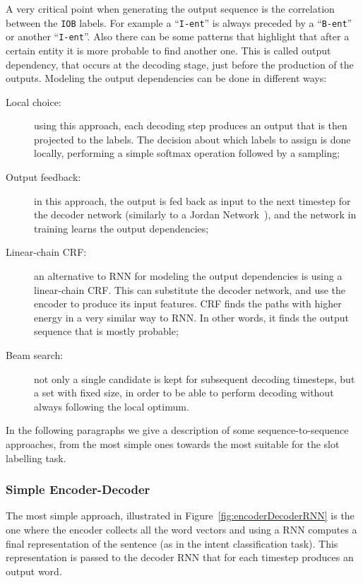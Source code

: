 A very critical point when generating the output sequence is the correlation between the \texttt{IOB} labels. For example a ``\texttt{I-ent}'' is always preceded by a ``\texttt{B-ent}'' or another ``\texttt{I-ent}''. Also there can be some patterns that highlight that after a certain entity it is more probable to find another one. This is called output dependency, that occurs at the decoding stage, just before the production of the outputs. 
Modeling the output dependencies can be done in different ways:

\begin{description}
	\item[Local choice:] using this approach, each decoding step produces an output that is then projected to the labels. The decision about which labels to assign is done locally, performing a simple softmax operation followed by a sampling;
	\item[Output feedback:]  in this approach, the output is fed back as input to the next timestep for the decoder network (similarly to a Jordan Network~\cite{jordan1997serial}), and the network in training learns the output dependencies;
	\item[Linear-chain CRF:] an alternative to RNN for modeling the output dependencies is using a linear-chain CRF. This can substitute the decoder network, and use the encoder to produce its input features. CRF finds the paths with higher energy in a very similar way to RNN. In other words, it finds the output sequence that is mostly probable;
	\item[Beam search:] not only a single candidate is kept for subsequent decoding timesteps, but a set with fixed size, in order to be able to perform decoding without always following the local optimum.
\end{description}

In the following paragraphs we give a description of some sequence-to-sequence approaches, from the most simple ones towards the most suitable for the slot labelling task.

\subsubsection{Simple Encoder-Decoder}
The most simple approach, illustrated in Figure~\ref{fig:encoderDecoderRNN} is the one where the encoder collects all the word vectors and using a RNN computes a final representation of the sentence (as in the intent classification task). This representation is passed to the decoder RNN that for each timestep produces an output word.

